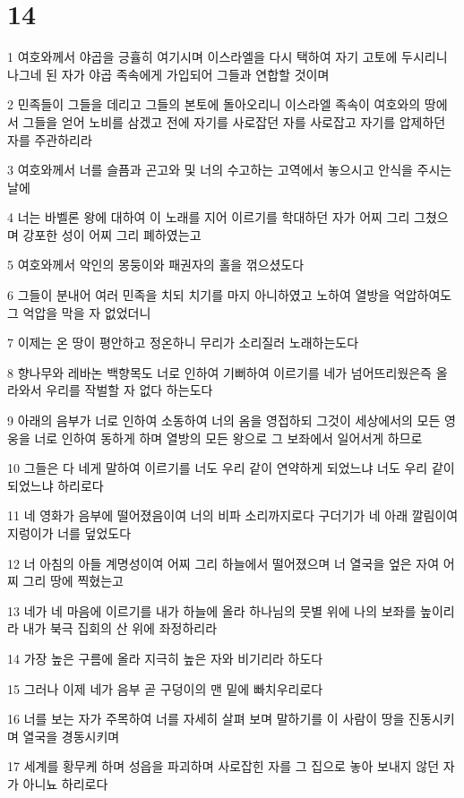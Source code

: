 \chapter{14}

\par 1 여호와께서 야곱을 긍휼히 여기시며 이스라엘을 다시 택하여 자기 고토에 두시리니 나그네 된 자가 야곱 족속에게 가입되어 그들과 연합할 것이며
\par 2 민족들이 그들을 데리고 그들의 본토에 돌아오리니 이스라엘 족속이 여호와의 땅에서 그들을 얻어 노비를 삼겠고 전에 자기를 사로잡던 자를 사로잡고 자기를 압제하던 자를 주관하리라
\par 3 여호와께서 너를 슬픔과 곤고와 및 너의 수고하는 고역에서 놓으시고 안식을 주시는 날에
\par 4 너는 바벨론 왕에 대하여 이 노래를 지어 이르기를 학대하던 자가 어찌 그리 그쳤으며 강포한 성이 어찌 그리 폐하였는고
\par 5 여호와께서 악인의 몽둥이와 패권자의 홀을 꺾으셨도다
\par 6 그들이 분내어 여러 민족을 치되 치기를 마지 아니하였고 노하여 열방을 억압하여도 그 억압을 막을 자 없었더니
\par 7 이제는 온 땅이 평안하고 정온하니 무리가 소리질러 노래하는도다
\par 8 향나무와 레바논 백향목도 너로 인하여 기뻐하여 이르기를 네가 넘어뜨리웠은즉 올라와서 우리를 작벌할 자 없다 하는도다
\par 9 아래의 음부가 너로 인하여 소동하여 너의 옴을 영접하되 그것이 세상에서의 모든 영웅을 너로 인하여 동하게 하며 열방의 모든 왕으로 그 보좌에서 일어서게 하므로
\par 10 그들은 다 네게 말하여 이르기를 너도 우리 같이 연약하게 되었느냐 너도 우리 같이 되었느냐 하리로다
\par 11 네 영화가 음부에 떨어졌음이여 너의 비파 소리까지로다 구더기가 네 아래 깔림이여 지렁이가 너를 덮었도다
\par 12 너 아침의 아들 계명성이여 어찌 그리 하늘에서 떨어졌으며 너 열국을 엎은 자여 어찌 그리 땅에 찍혔는고
\par 13 네가 네 마음에 이르기를 내가 하늘에 올라 하나님의 뭇별 위에 나의 보좌를 높이리라 내가 북극 집회의 산 위에 좌정하리라
\par 14 가장 높은 구름에 올라 지극히 높은 자와 비기리라 하도다
\par 15 그러나 이제 네가 음부 곧 구덩이의 맨 밑에 빠치우리로다
\par 16 너를 보는 자가 주목하여 너를 자세히 살펴 보며 말하기를 이 사람이 땅을 진동시키며 열국을 경동시키며
\par 17 세계를 황무케 하며 성읍을 파괴하며 사로잡힌 자를 그 집으로 놓아 보내지 않던 자가 아니뇨 하리로다
